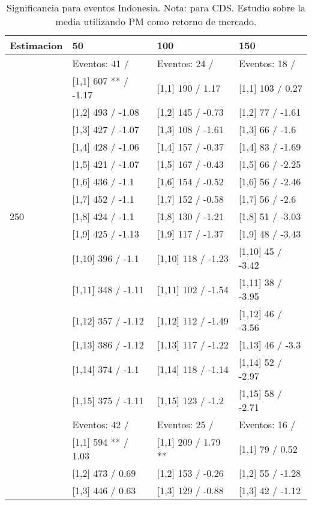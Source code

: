 \begin{table}

\caption{Significancia para eventos Indonesia. Nota: para CDS. Estudio sobre la media utilizando PM como retorno de mercado.}
\centering
\begin{tabular}[t]{llll}
\toprule
Estimacion & 50 & 100 & 150\\
\midrule
 & Eventos:  41 / & Eventos:  24 / & Eventos:  18 /\\
 & {}[1,1] 607 ** / -1.17 & {}[1,1] 190  / 1.17 & {}[1,1] 103  / 0.27\\
 & {}[1,2] 493  / -1.08 & {}[1,2] 145  / -0.73 & {}[1,2] 77  / -1.61\\
 & {}[1,3] 427  / -1.07 & {}[1,3] 108  / -1.61 & {}[1,3] 66  / -1.6\\
 & {}[1,4] 428  / -1.06 & {}[1,4] 157  / -0.37 & {}[1,4] 83  / -1.69\\
\addlinespace
 & {}[1,5] 421  / -1.07 & {}[1,5] 167  / -0.43 & {}[1,5] 66  / -2.25\\
 & {}[1,6] 436  / -1.1 & {}[1,6] 154  / -0.52 & {}[1,6] 56  / -2.46\\
 & {}[1,7] 452  / -1.1 & {}[1,7] 152  / -0.58 & {}[1,7] 56  / -2.6\\
250 & {}[1,8] 424  / -1.1 & {}[1,8] 130  / -1.21 & {}[1,8] 51  / -3.03\\
 & {}[1,9] 425  / -1.13 & {}[1,9] 117  / -1.37 & {}[1,9] 48  / -3.43\\
\addlinespace
 & {}[1,10] 396  / -1.1 & {}[1,10] 118  / -1.23 & {}[1,10] 45  / -3.42\\
 & {}[1,11] 348  / -1.11 & {}[1,11] 102  / -1.54 & {}[1,11] 38  / -3.95\\
 & {}[1,12] 357  / -1.12 & {}[1,12] 112  / -1.49 & {}[1,12] 46  / -3.56\\
 & {}[1,13] 386  / -1.12 & {}[1,13] 117  / -1.22 & {}[1,13] 46  / -3.3\\
 & {}[1,14] 374  / -1.1 & {}[1,14] 118  / -1.14 & {}[1,14] 52  / -2.97\\
\addlinespace
 & {}[1,15] 375  / -1.11 & {}[1,15] 123  / -1.2 & {}[1,15] 58  / -2.71\\
 & Eventos:  42 / & Eventos:  25 / & Eventos:  16 /\\
 & {}[1,1] 594 ** / 1.03 & {}[1,1] 209  / 1.79 ** & {}[1,1] 79  / 0.52\\
 & {}[1,2] 473  / 0.69 & {}[1,2] 153  / -0.26 & {}[1,2] 55  / -1.28\\
 & {}[1,3] 446  / 0.63 & {}[1,3] 129  / -0.88 & {}[1,3] 42  / -1.12\\

\end{tabular}
\end{table}
